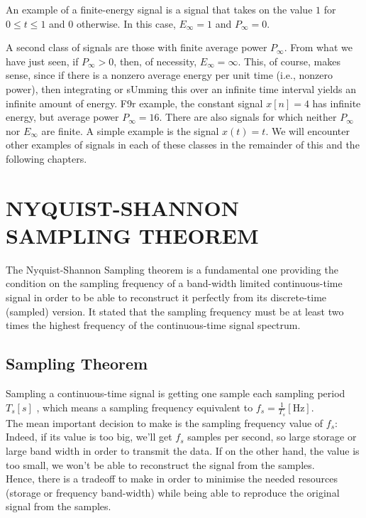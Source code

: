 \documentclass{report}
\begin{document}
An example of a finite-energy signal is a signal that takes on the value \(1\) for \(0\leq t\leq 1\) and \(0\) otherwise. In this case, \(E_{\infty
}=1\) and \(P_{\infty }=0\).

A second class of signals are those with finite average power \(P_{\infty }.\) From what we have just seen, if \(P_{\infty }>0\), then, of necessity,
\(E_{\infty }=\infty\). This, of course, makes sense, since if there is a nonzero average energy per unit time (i.e., nonzero power), then integrating
or sUmming this over an infinite time interval yields an infinite amount of energy. F9r example, the constant signal \(x[n] = 4\) has infinite energy,
but average power \(P_{\infty }=16\). There are also signals for which neither \(P_{\infty }\) nor \(E_{\infty }\) are finite. A simple example is
the signal \(x(t) = t\). We will encounter other examples of signals in each of these classes in the remainder of this and the following chapters.

\section*{NYQUIST-SHANNON SAMPLING THEOREM}

The Nyquist-Shannon Sampling theorem is a fundamental one providing the condition on the sampling frequency of a band-width limited continuous-time
signal in order to be able to reconstruct it perfectly from its discrete-time (sampled) version. It stated that the sampling frequency must be at
least two times the highest frequency of the continuous-time signal spectrum.

\subsection*{Sampling Theorem}

Sampling a continuous-time signal is getting one sample each sampling period \(T_s[s]\) , which means a sampling frequency equivalent to \(f_s=\frac{1}{T_s}[\text{Hz}]\).\\
The mean important decision to make is the sampling frequency value of \(f_s\): Indeed, if its value is too big, we{'}ll get \(f_s\) samples per
second, so large storage or large band width in order to transmit the data. If on the other hand, the value is too small, we won{'}t be able to reconstruct
the signal from the samples.\\
Hence, there is a tradeoff to make in order to minimise the needed resources (storage or frequency band-width) while being able to reproduce the
original signal from the samples.
\end{document}
